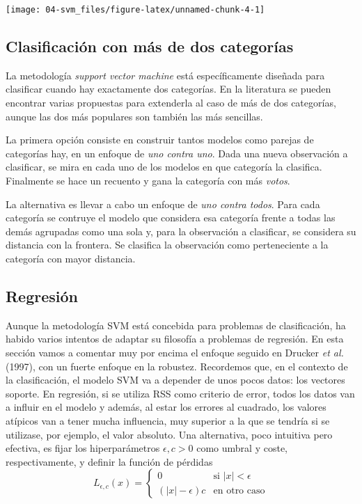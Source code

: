 \documentclass[
]{book}
\theoremstyle{break}
\theoremstyle{definition}
\theoremstyle{definition}
\theoremstyle{definition}
\theoremstyle{definition}
\theoremstyle{remark}
\begin{document}
\begin{center}\texttt{[image: 04-svm\_files/figure-latex/unnamed-chunk-4-1]} \end{center}

\hypertarget{clasificaciuxf3n-con-muxe1s-de-dos-categoruxedas}{%
\subsection{Clasificación con más de dos categorías}\label{clasificaciuxf3n-con-muxe1s-de-dos-categoruxedas}}

La metodología \emph{support vector machine} está específicamente diseñada para clasificar cuando hay exactamente dos categorías. En la literatura se pueden encontrar varias propuestas para extenderla al caso de más de dos categorías, aunque las dos más populares son también las más sencillas.

La primera opción consiste en construir tantos modelos como parejas de categorías hay, en un enfoque de \emph{uno contra uno}. Dada una nueva observación a clasificar, se mira en cada uno de los modelos en que categoría la clasifica. Finalmente se hace un recuento y gana la categoría con más \emph{votos}.

La alternativa es llevar a cabo un enfoque de \emph{uno contra todos}. Para cada categoría se contruye el modelo que considera esa categoría frente a todas las demás agrupadas como una sola y, para la observación a clasificar, se considera su distancia con la frontera. Se clasifica la observación como perteneciente a la categoría con mayor distancia.

\hypertarget{regresiuxf3n}{%
\subsection{Regresión}\label{regresiuxf3n}}

Aunque la metodología SVM está concebida para problemas de clasificación, ha habido varios intentos de adaptar su filosofía a problemas de regresión. En esta sección vamos a comentar muy por encima el enfoque seguido en Drucker \emph{et al.} (1997), con un fuerte enfoque en la robustez. Recordemos que, en el contexto de la clasificación, el modelo SVM va a depender de unos pocos datos: los vectores soporte. En regresión, si se utiliza RSS como criterio de error, todos los datos van a influir en el modelo y además, al estar los errores al cuadrado, los valores atípicos van a tener mucha influencia, muy superior a la que se tendría si se utilizase, por ejemplo, el valor absoluto. Una alternativa, poco intuitiva pero efectiva, es fijar los hiperparámetros \(\epsilon,c > 0\) como umbral y coste, respectivamente, y definir la función de pérdidas
\[
L_{\epsilon,c} (x) = \left\{ \begin{array}{ll}
  0 & \mbox{si } |x|< \epsilon \\
  (|x| - \epsilon)c & \mbox{en otro caso}
  \end{array}
  \right.
\]
\end{document}
